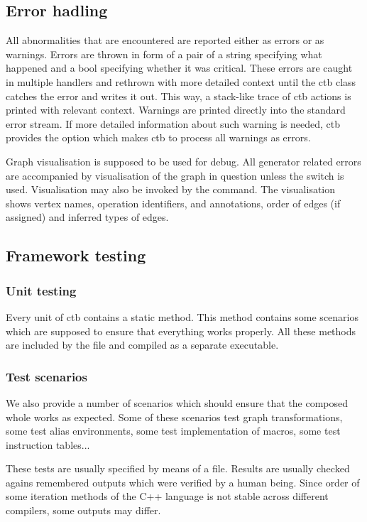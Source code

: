 \label{sec:testing}
\subsection*{Error hadling}
All abnormalities that are encountered are reported either as errors or as warnings. Errors are thrown in form of a pair of a string specifying what happened and a bool specifying whether it was critical. These errors are caught in multiple  handlers and rethrown with more detailed context until the ctb class catches the error and writes it out. This way, a stack-like trace of ctb actions is printed with relevant context.  Warnings are printed directly into the standard error stream. If more detailed information about such warning is needed, ctb provides the  option which makes ctb to process all warnings as errors. 

Graph visualisation is supposed to be used for debug. All generator related errors are accompanied by visualisation of the graph in question unless the  switch is used. Visualisation may also be invoked by the  command. The visualisation shows vertex names, operation identifiers,  and  annotations, order of edges (if assigned) and inferred types of edges.

\subsection*{Framework testing}

\subsubsection{Unit testing}
Every unit of ctb contains a static  method. This method contains some scenarios which are supposed to ensure that everything works properly. All these methods are included by the  file and compiled as a separate executable.

\subsubsection{Test scenarios}
We also provide a number of scenarios which should ensure that the composed whole works as expected. Some of these scenarios test graph transformations, some test alias environments, some test implementation of macros, some test instruction tables...

These tests are usually specified by means of a  file. Results are usually checked agains remembered outputs which were verified by a human being. Since order of some iteration methods of the C++ language is not stable across different compilers, some outputs may differ.

